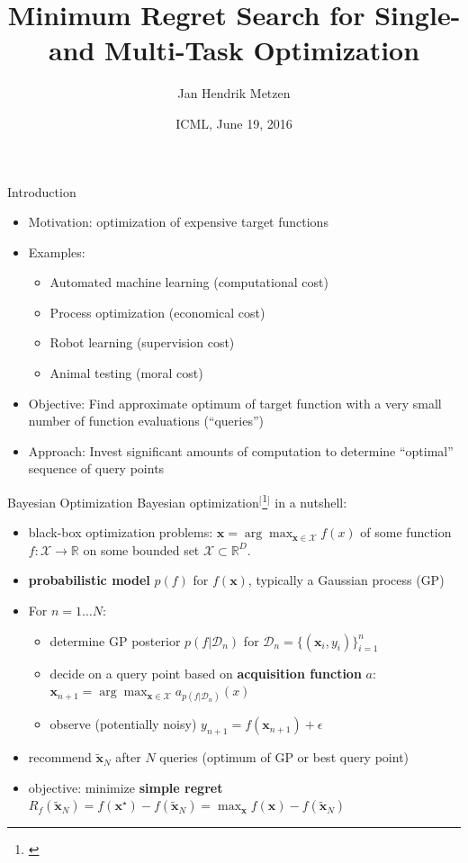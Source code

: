 \documentclass[11pt]{beamer}
\title[ICML 2016]{Minimum Regret Search for Single- and Multi-Task Optimization}
\author[Jan Hendrik Metzen]{Jan Hendrik Metzen}
\institute[]{University Bremen, Robotics Research Group \\ Robert Bosch GmbH, Corporate Research CR/AEY2}
\date[06/19/16]{ICML, June 19, 2016}
\newcommand{\footcite}[1]{$^[$\footnote{\begin{tiny}\bibentry{#1}\end{tiny}}$^]$}
\renewcommand{\emph}[1]{\textbf{#1}}
\begin{document}

\begin{frame}{Introduction}

\begin{itemize}
  \item Motivation: optimization of expensive target functions
  \item Examples:
  \begin{itemize}
    \item Automated machine learning (computational cost)
    \item Process optimization (economical cost)
    \item Robot learning (supervision cost)
    \item Animal testing (moral cost)
  \end{itemize}
  \pause
  \item Objective: Find approximate optimum of target function with a very small number of function evaluations (``queries'')
  \pause
   \item Approach: Invest significant amounts of computation to determine ``optimal'' sequence of query points
\end{itemize}
\vspace*{4cm}
\end{frame}

\begin{frame}{Bayesian Optimization}
Bayesian optimization\footcite{shahriari_taking_2016} in a nutshell:
\begin{itemize}
\item black-box optimization problems: $\mathbf{x} = \arg\max_{\mathbf{x} \in \mathcal{X}} f(x)$ of some function $f: \mathcal{X} \to \mathbb{R}$ on some bounded set $\mathcal{X} \subset \mathbb{R}^D$.
\item \emph{probabilistic model} $p(f)$ for $f(\mathbf{x})$, typically a Gaussian process (GP)
\pause
\item For $n=1\dots N$:
\begin{itemize}
   \item determine GP posterior $p(f\vert \mathcal{D}_n)$ for $\mathcal{D}_n=\{(\mathbf{x}_i, y_i)\}_{i=1}^n$ 
   \item decide on a query point based on \emph{acquisition function} $a$: $\mathbf{x}_{n+1} = \arg\max_{\mathbf{x} \in \mathcal{X}} a_{p(f\vert \mathcal{D}_n)}(x) $
\item observe (potentially noisy) $y_{n+1} = f(\mathbf{x}_{n+1}) + \epsilon$
\end{itemize}
\pause
\item recommend $\mathbf{\tilde x}_N$ after $N$ queries (optimum of GP or best query point)
\item objective: minimize \emph{simple regret} 
$R_f(\mathbf{\tilde  x}_N) = f(\mathbf{x}^\star) - f(\mathbf{\tilde  x}_N) = \max_{\mathbf{x}} f(\mathbf{x}) - f(\mathbf{\tilde x}_N)$
\end{itemize}
\vspace*{2cm}
\end{frame}
\end{document}
